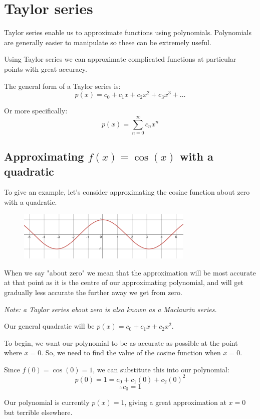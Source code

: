 \documentclass[../main.tex]{subfiles}
\begin{document}
\section{Taylor series}
Taylor series enable us to approximate functions using polynomials. Polynomials are generally easier to manipulate so these can be extremely useful.

Using Taylor series we can approximate complicated functions at particular points with great accuracy.

The general form of a Taylor series is:
\[p(x)=c_0 + c_1x + c_2x^2 + c_3x^3 + \dots\]

Or more specifically:
\[p(x)=\sum\limits_{n=0}^\infty c_nx^n\]


\subsection*{Approximating $f(x)=\cos{(x)}$ with a quadratic}
To give an example, let's consider approximating the cosine function about zero with a quadratic.

\begin{figure}[h]
    \centering
    \includegraphics[width=0.75\textwidth]{images/taylorseries1.png}
\end{figure}

When we say "about zero" we mean that the approximation will be most accurate at that point as it is the centre of our approximating polynomial, and will get gradually less accurate the further away we get from zero.

\textit{Note: a Taylor series about zero is also known as a Maclaurin series.}

Our general quadratic will be $p(x) = c_0 + c_1x + c_2x^2$.

To begin, we want our polynomial to be as accurate as possible at the point where $x=0$. So, we need to find the value of the cosine function when $x=0$. 

Since $f(0)=\cos{(0)}=1$, we can substitute this into our polynomial:
\[p(0) = 1 = c_0+c_1(0)+c_2(0)^2\]
\[\therefore c_0=1\]

Our polynomial is currently $p(x) = 1$, giving a great approximation at $x=0$ but terrible elsewhere.
\end{document}
